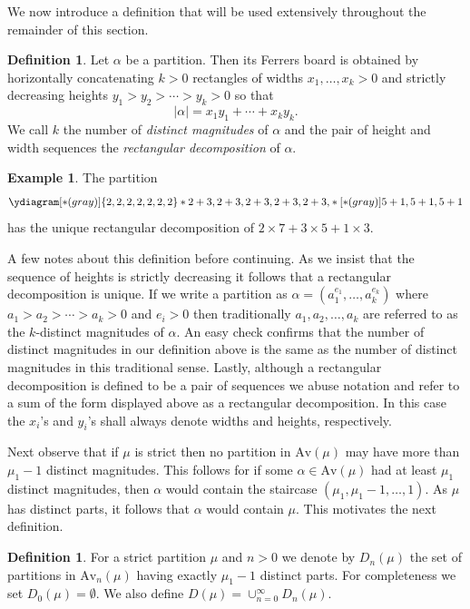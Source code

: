 \documentclass{article}
\theoremstyle{plain}
\theoremstyle{definition}
\newtheorem{definition}[theorem]{Definition}
\newtheorem{example}[theorem]{Example}
\newcommand{\Av}{\text{Av}}
\begin{document}
We now introduce a definition that will be used extensively throughout the remainder of this section.

\begin{definition}
Let $\alpha$ be a partition.  Then its Ferrers board is obtained by horizontally concatenating $k>0$ rectangles of widths $x_1,\ldots, x_k>0$ and strictly decreasing heights $y_1> y_2> \cdots> y_k>0$ so that
$$|\alpha|=x_1y_1 + \cdots +x_ky_k.$$
We call $k$ the number of \emph{distinct magnitudes} of $\alpha$ and the pair of height and width sequences the \emph{rectangular decomposition} of $\alpha$. 
\end{definition}

\begin{example}
The partition 
$$\ydiagram[*(gray)]{2,2,2,2,2,2,2}*{2+3,2+3,2+3,2+3,2+3,}*[*(gray)]{5+1, 5+1,5+1}$$ 
has the unique rectangular decomposition of $2\times 7 + 3\times 5 + 1\times 3$.  
\end{example}


A few notes about this definition before continuing.  As we insist that the sequence of heights is strictly decreasing it follows that a rectangular decomposition is unique.  If we write a partition as $\alpha = (a_1^{e_1}, \ldots, a_k^{e_k})$ where $a_1>a_2>\cdots >a_k>0$ and $e_i>0$ then traditionally $a_1,a_2,\ldots, a_k$ are referred to as the $k$-distinct magnitudes of $\alpha$.  An easy check confirms that the number of distinct magnitudes in our definition above is the same as the number of distinct magnitudes in this traditional sense.  Lastly, although a rectangular decomposition is defined to be a pair of sequences we abuse notation and refer to a sum of the form displayed above as a rectangular decomposition.  In this case the $x_i$'s and $y_i$'s shall always denote widths and heights, respectively.


Next observe that if $\mu$ is strict then no partition in $\Av(\mu)$ may have more than $\mu_1-1$ distinct magnitudes.  This follows for if some $\alpha\in \Av(\mu)$ had at least $\mu_1$ distinct magnitudes, then $\alpha$ would contain the staircase $(\mu_1,\mu_1-1,\ldots, 1)$.  As $\mu$ has distinct parts, it follows that $\alpha$ would contain $\mu$.  This motivates the next definition.  

\begin{definition}
For a strict partition $\mu$ and $n>0$ we denote by $D_n(\mu)$ the set of partitions in $\Av_n(\mu)$ having exactly $\mu_1-1$ distinct parts.  For completeness we set $D_0(\mu) = \emptyset$.  We also define $D(\mu) = \cup_{n=0}^\infty D_n(\mu)$.  
\end{definition}
\end{document}
